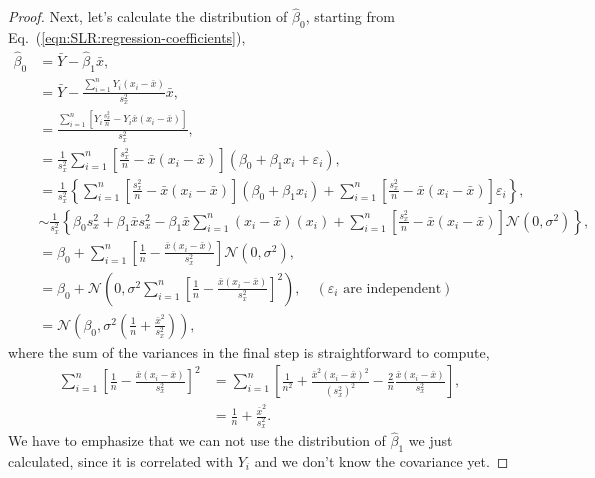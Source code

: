 \documentclass{book}
\begin{document}
\begin{proof}
Next, let's calculate the distribution of $\hat{\beta}_0$, starting from Eq.~(\ref{eqn:SLR:regression-coefficients}),
\begin{align*}
    \hat{\beta}_0 &= \bar{Y} - \hat\beta_1 \bar{x},\\
    &= \bar{Y} - \frac{\sum_{i=1}^n Y_i (x_i - \bar{x})}{s_x^2} \bar{x},\\
    &= \frac{\sum_{i=1}^n \left[Y_i \frac{s_x^2}{n} - Y_i \bar{x}(x_i - \bar{x})\right]}{s_x^2},\\
    &= \frac{1}{s_x^2}\sum_{i=1}^n \left[ \frac{s_x^2}{n} - \bar{x}(x_i - \bar{x})\right](\beta_0 +\beta_1  x_i +\varepsilon_i),\\
    &=  \frac{1}{s_x^2}
    \left\{
    \sum_{i=1}^n \left[ \frac{s_x^2}{n} - \bar{x}(x_i - \bar{x})\right](\beta_0 +\beta_1  x_i) + 
    \sum_{i=1}^n \left[ \frac{s_x^2}{n} - \bar{x}(x_i - \bar{x})\right] \varepsilon_i
    \right\},\\
    &\sim \frac{1}{s_x^2}
    \left\{
    \beta_0 s_x^2 + \beta_1 \bar{x} s_x^2 - 
    \beta_1 \bar{x}  \sum_{i=1}^n (x_i - \bar{x})( x_i) + 
    \sum_{i=1}^n \left[ \frac{s_x^2}{n} - \bar{x}(x_i - \bar{x})\right] \mathcal{N}(0,\sigma^2)
    \right\},\\
    &= \beta_0 + 
    \sum_{i=1}^n \left[ \frac{1}{n} - \frac{\bar{x}(x_i - \bar{x})}{s_x^2}\right] \mathcal{N}(0,\sigma^2),\\
    &= \beta_0 + 
     \mathcal{N}\left(0,\sigma^2 \sum_{i=1}^n \left[ \frac{1}{n} - \frac{\bar{x}(x_i - \bar{x})}{s_x^2}\right]^2\right),\quad (\varepsilon_i\text{ are independent})\\
    &= \mathcal{N}\left(\beta_0,\sigma^2 \left(\frac{1}{n} + \frac{\bar{x}^2}{s_x^2}\right) \right),
\end{align*}
where the sum of the variances in the final step is straightforward to compute,
\begin{align*}
    \sum_{i=1}^n \left[ \frac{1}{n} - \frac{\bar{x}(x_i - \bar{x})}{s_x^2}\right]^2
    &= \sum_{i=1}^n \left[ \frac{1}{n^2} + \frac{\bar{x}^2(x_i - \bar{x})^2}{(s_x^2)^2} - \frac{2}{n}\frac{\bar{x}(x_i - \bar{x})}{s_x^2}\right],\\
    &= \frac{1}{n} + \frac{\bar{x}^2}{s_x^2}. 
\end{align*}
We have to emphasize that we can not use the distribution of $\hat{\beta}_1$ we just calculated, since it is correlated with $Y_i$ and we don't know the covariance yet.


\end{proof}
\end{document}
